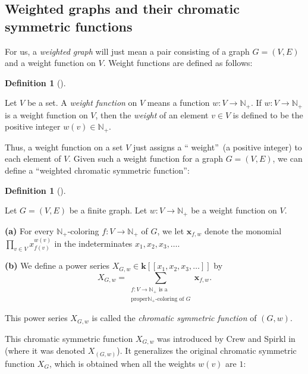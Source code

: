 \documentclass[numbers=enddot,12pt,final,onecolumn,notitlepage]{scrartcl}%
\theoremstyle{definition}
\newtheorem{defi}[theo]{Definition}
\newenvironment{definition}[1][]
{\begin{defi}[#1]\begin{leftbar}}
{\end{leftbar}\end{defi}}
\let\sumnonlimits\sum
\let\prodnonlimits\prod
\renewcommand{\sum}{\sumnonlimits\limits}
\renewcommand{\prod}{\prodnonlimits\limits}
\begin{document}
\subsection{Weighted graphs and their chromatic symmetric functions}

For us, a \emph{weighted graph} will just mean a pair consisting of a graph
$G=\left(  V,E\right)  $ and a weight function on $V$. Weight functions are
defined as follows:

\begin{definition}
\label{def.weight}Let $V$ be a set. A \emph{weight function} on $V$ means a
function $w:V\rightarrow\mathbb{N}_{+}$. If $w:V\rightarrow\mathbb{N}_{+}$ is
a weight function on $V$, then the \emph{weight} of an element $v\in V$ is
defined to be the positive integer $w\left(  v\right)  \in\mathbb{N}_{+}$.
\end{definition}

Thus, a weight function on a set $V$ just assigns a \textquotedblleft
weight\textquotedblright\ (a positive integer) to each element of $V$. Given
such a weight function for a graph $G=\left(  V,E\right)  $, we can define a
\textquotedblleft weighted chromatic symmetric function\textquotedblright:

\begin{definition}
\label{def.wchromsym}Let $G=\left(  V,E\right)  $ be a finite graph. Let
$w:V\rightarrow\mathbb{N}_{+}$ be a weight function on $V$.

\textbf{(a)} For every $\mathbb{N}_{+}$-coloring $f:V\rightarrow\mathbb{N}%
_{+}$ of $G$, we let $\mathbf{x}_{f,w}$ denote the monomial $\prod_{v\in
V}x_{f\left(  v\right)  }^{w\left(  v\right)  }$ in the indeterminates
$x_{1},x_{2},x_{3},\ldots$.

\textbf{(b)} We define a power series $X_{G,w}\in\mathbf{k}\left[  \left[
x_{1},x_{2},x_{3},\ldots\right]  \right]  $ by%
\[
X_{G,w}=\sum_{\substack{f:V\rightarrow\mathbb{N}_{+}\text{ is a}\\\text{proper
}\mathbb{N}_{+}\text{-coloring of }G}}\mathbf{x}_{f,w}.
\]


This power series $X_{G,w}$ is called the \emph{chromatic symmetric function}
of $\left(  G,w\right)  $.
\end{definition}

This chromatic symmetric function $X_{G,w}$ was introduced by Crew and Spirkl
in \cite[(1)]{CreSpi19} (where it was denoted $X_{\left(  G,w\right)  }$). It
generalizes the original chromatic symmetric function $X_{G}$, which is
obtained when all the weights $w\left(  v\right)  $ are $1$:
\end{document}
